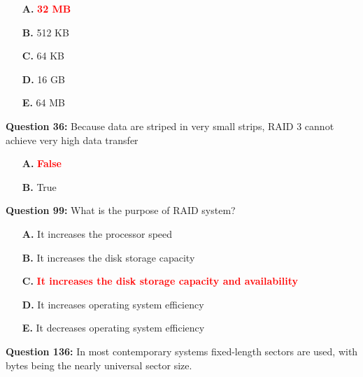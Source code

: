 \documentclass[12pt,a4paper]{article}
\begin{document}
\begin{itemize}
    \item[\textbf{A.}] \textcolor{red}{\textbf{32 MB}}
    \item[\textbf{B.}] 512 KB
    \item[\textbf{C.}] 64 KB
    \item[\textbf{D.}] 16 GB
    \item[\textbf{E.}] 64 MB
\end{itemize}

\vspace{0.5cm}

\vspace{0.5cm}

\textbf{Question 36:} Because data are striped in very small strips, RAID 3 cannot achieve very high data transfer

\begin{itemize}
    \item[\textbf{A.}] \textcolor{red}{\textbf{False}}
    \item[\textbf{B.}] True
\end{itemize}

\vspace{0.5cm}

\vspace{0.5cm}

\textbf{Question 99:} What is the purpose of RAID system?

\begin{itemize}
    \item[\textbf{A.}] It increases the processor speed
    \item[\textbf{B.}] It increases the disk storage capacity
    \item[\textbf{C.}] \textcolor{red}{\textbf{It increases the disk storage capacity and availability}}
    \item[\textbf{D.}] It increases operating system efficiency
    \item[\textbf{E.}] It decreases operating system efficiency
\end{itemize}

\vspace{0.5cm}

\vspace{0.5cm}

\textbf{Question 136:} In most contemporary systems fixed-length sectors are used, with \underline{\hspace{1.5cm}} bytes being the nearly universal sector size.
\end{document}
